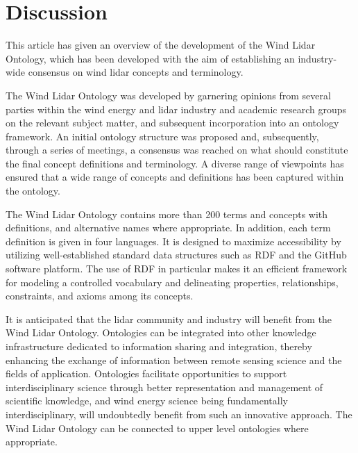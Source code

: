 \documentclass[remotesensing,article,submit,pdftex,moreauthors]{Definitions/mdpi}
\begin{document}
\newpage
\section{Discussion}
\label{sec:Discussion}
This article has given an overview of the development of the Wind Lidar Ontology, which has been developed with the aim of establishing an industry-wide consensus on wind lidar concepts and terminology. 

The Wind Lidar Ontology was developed by garnering opinions from several parties within the wind energy and lidar industry and academic research groups on the relevant subject matter, and subsequent incorporation into an ontology framework. 
An initial ontology structure was proposed and, subsequently, through a series of meetings, a consensus was reached on what should constitute the final concept definitions and terminology.
A diverse range of viewpoints has ensured that a wide range of concepts and definitions has been captured within the ontology. 

The Wind Lidar Ontology contains more than 200 terms and concepts with definitions, and alternative names where appropriate. In addition, each term definition is given in four languages. 
It is designed to maximize accessibility by utilizing well-established standard data structures such as RDF and the GitHub software platform. The use of RDF in particular makes it an efficient framework for modeling a controlled vocabulary and delineating properties, relationships, constraints, and axioms among its concepts.

It is anticipated that the lidar community and industry will benefit from the Wind Lidar Ontology.
Ontologies can be integrated into other knowledge infrastructure dedicated to information sharing and integration, thereby enhancing the exchange of information between remote sensing science and the fields of application. Ontologies facilitate opportunities to support interdisciplinary science through better representation and management of scientific knowledge, and wind energy science being fundamentally interdisciplinary, will undoubtedly benefit from such an innovative approach. The Wind Lidar Ontology can be connected to upper level ontologies where appropriate.
\end{document}

